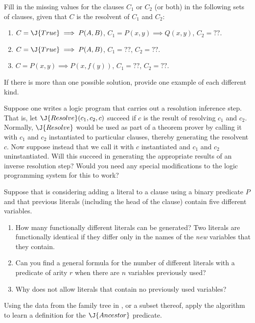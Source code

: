 
\begin{exercise}%
Fill in the missing values for the clauses \(C_1\) or \(C_2\) (or both) in the
following sets of clauses, given that \(C\) is the resolvent of \(C_1\)
and \(C_2\):
\begin{enumerate}
\item \(C = \J{True} \implies P(A,B)\), \(C_1 = P(x,y) \implies Q(x,y)\), \(C_2
= ??\).
\item \(C = \J{True} \implies P(A,B)\), \(C_1 = ??\), \(C_2 = ??\).
\item \(C = P(x,y) \implies P(x,f(y))\), \(C_1 = ??\), \(C_2 = ??\).
\end{enumerate}
If there is more than one possible solution, provide one example of
each different kind.
\end{exercise} 

\begin{exercise}%
\prgex Suppose one writes a logic program that carries out a
resolution inference step. That is, let \(\J{Resolve}(c_1,c_2,c)\) succeed
if \(c\) is the result of resolving \(c_1\) and \(c_2\). Normally, \(\J{Resolve}\)
would be used as part of a theorem prover by calling it with \(c_1\) and
\(c_2\) instantiated to particular clauses, thereby generating the
resolvent \(c\). Now suppose instead that we call it with \(c\)
instantiated and \(c_1\) and \(c_2\) uninstantiated. Will this succeed in
generating the appropriate results of an inverse resolution step?
Would you need any special modifications to the logic programming
system for this to work?
\end{exercise} 

\begin{exercise}%
Suppose that  is considering adding a literal to a clause
using a binary predicate \(P\) and that previous literals (including
the head of the clause) contain five different variables. 
\begin{enumerate}
\item How many
functionally different literals can be generated? Two
literals are functionally identical if they differ only in the names
of the {\em new} variables that they contain.
\item Can you find a
general formula for the number of different literals with a predicate
of arity \(r\) when there are \(n\) variables previously used?
\item Why does  not allow literals that contain no
previously used variables?
\end{enumerate}
\end{exercise} 

\begin{uexercise}
Using the data from the family tree in , or a
subset thereof, apply the  algorithm to learn a definition
for the \(\J{Ancestor}\) predicate.
\end{uexercise} 




\resetmedskipamount
